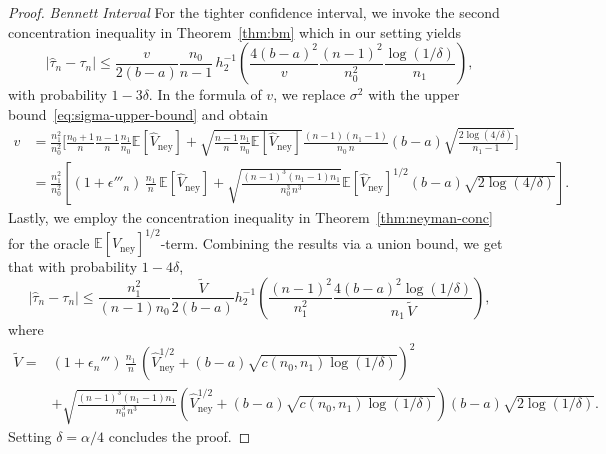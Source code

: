 \documentclass[aos]{imsart2}
\theoremstyle{plain}
\theoremstyle{definition}
\newcommand{\E}{\mathbb{E}}
\newcommand{\vhn}{\hat{V}_{\mathrm{ney}}}
\newcommand{\tauh}{\hat{\tau}}
\begin{document}
\begin{appendix}
\begin{proof}
    \textit{Bennett Interval} For the tighter confidence interval, we invoke the second concentration inequality in Theorem~\ref{thm:bm} which in our setting yields
    \begin{equation*}
        \left\vert\tauh_n-\tau_n\right\vert \leq \frac{v}{2(b-a)}\frac{n_0}{n-1}\, h^{-1}_2\!\!\left(\frac{4(b-a)^2}{v}\frac{(n-1)^2}{n_0^2}\frac{\log(1/\delta)}{n_1}\right),
    \end{equation*}
    with probability $1-3\delta$. In the formula of $v$, we replace $\sigma^2$ with the upper bound~\eqref{eq:sigma-upper-bound} and obtain
    \begin{align*}
        v &=  \frac{n_1^2}{n_0^2}\Bigg[\frac{n_0+1}{n}\frac{n-1}{n}\frac{n_1}{n_0}\E[\vhn]+ \sqrt{\frac{n-1}{n}\frac{n_1}{n_0}\E[\vhn]} \frac{(n-1)(n_1-1)}{n_0\,n}(b-a) \sqrt{\frac{2\log(4/\delta)}{n_1-1}} \Bigg]\\
        &= \frac{n_1^2}{n_0^2}\left[(1+\epsilon'''_n)\,\frac{n_1}{n}\,\E[\vhn] + \sqrt{\frac{(n-1)^3(n_1-1)n_1}{n_0^3\,n^3}}\E[\vhn]^{1/2}(b-a)\sqrt{2\log(4/\delta)}\right].%
    \end{align*}
    Lastly, we employ the concentration inequality in Theorem~\ref{thm:neyman-conc} for the oracle $\E[\vhn]^{1/2}$-term. Combining the results via a union bound, we get that with probability $1-4\delta$,
     \begin{equation*}
        \lvert\tauh_n - \tau_n \rvert \leq \frac{n_1^2}{(n-1)n_0}  \frac{\tilde{V}}{2(b-a)} h^{-1}_2\left(\frac{(n-1)^2}{n_1^2}\frac{4(b-a)^2\log(1/\delta)}{n_1\,\tilde{V}}\right),
    \end{equation*}
    where
     \begin{align*}
        \tilde{V} = &(1+\epsilon_n''')\,\frac{n_1}{n}\,\left(\vhn^{1/2}+ (b-a)\sqrt{c(n_0,n_1)\log(1/\delta)}\right)^2\\
        &+ \sqrt{\frac{(n-1)^3(n_1-1)n_1}{n_0^3\,n^3}}\left(\vhn^{1/2} + (b-a)\sqrt{c(n_0,n_1)\log(1/\delta)}\right)(b-a)\sqrt{2\log(1/\delta)}.
    \end{align*}
    Setting $\delta = \alpha/4$ concludes the proof.
\end{proof}



\end{appendix}
\end{document}
